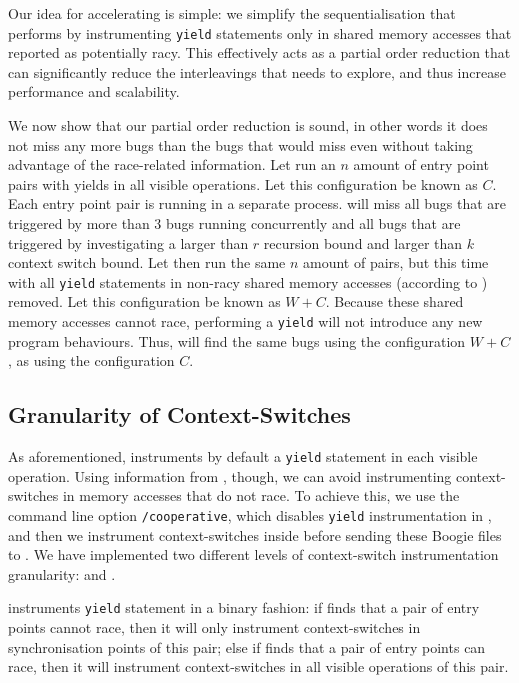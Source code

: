 Our idea for accelerating \corral is simple: we simplify the sequentialisation that \corral performs by instrumenting \texttt{yield} statements only in shared memory accesses that \whoop reported as potentially racy. This effectively acts as a partial order reduction that can significantly reduce the interleavings that \corral needs to explore, and thus increase performance and scalability.

We now show that our partial order reduction is sound, in other words it does not miss any more bugs than the bugs that \corral would miss even without taking advantage of the \whoop race-related information. Let \corral run an $n$ amount of entry point pairs with yields in all visible operations. Let this configuration be known as $C$. Each entry point pair is running in a separate \corral process. \corral will miss all bugs that are triggered by more than 3 bugs running concurrently and all bugs that are triggered by investigating a larger than $r$ recursion bound and larger than $k$ context switch bound. Let \corral then run the same $n$ amount of pairs, but this time with all \texttt{yield} statements in non-racy shared memory accesses (according to \whoop) removed. Let this configuration be known as $W+C$. Because these shared memory accesses cannot race, performing a \texttt{yield} will not introduce any new program behaviours. Thus, \corral will find the same bugs using the configuration $W+C$, as using the configuration $C$.

\subsection{Granularity of Context-Switches}
\label{bf:granularity}

As aforementioned, \corral instruments by default a \texttt{yield} statement in each visible operation. Using information from \whoop, though, we can avoid instrumenting context-switches in memory accesses that do not race. To achieve this, we use the \corral command line option \texttt{/cooperative}, which disables \texttt{yield} instrumentation in \corral, and then we instrument context-switches inside \whoop before sending these Boogie files to \corral. We have implemented two different levels of context-switch instrumentation granularity: \emph{\yieldcoarse} and \emph{\yieldmr}.

\yieldcoarse instruments \texttt{yield} statement in a binary fashion: if \whoop finds that a pair of entry points cannot race, then it will only instrument context-switches in synchronisation points of this pair; else if \whoop finds that a pair of entry points can race, then it will instrument context-switches in all visible operations of this pair.

